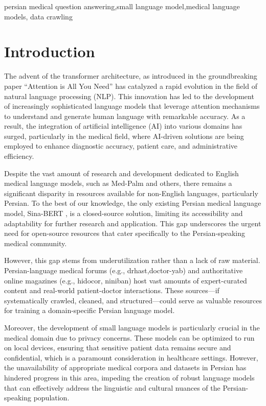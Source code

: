 \documentclass[conference]{IEEEtran}
\begin{document}
\begin{IEEEkeywords}
persian medical question answering,small language model,medical language models, data crawling
\end{IEEEkeywords}

\section{Introduction}
The advent of the transformer architecture, as introduced in the groundbreaking paper “Attention is All You Need”
\cite{b1}
has catalyzed a rapid evolution in the field of natural language processing (NLP). This innovation has led to the development of increasingly sophisticated language models that leverage attention mechanisms to understand and generate human language with remarkable accuracy. As a result, the integration of artificial intelligence (AI) into various domains has surged, particularly in the medical field, where AI-driven solutions are being employed to enhance diagnostic accuracy, patient care, and administrative efficiency.

Despite the vast amount of research and development dedicated to English medical language models, such as Med-Palm
\cite{b2} \cite{b3}
and others, there remains a significant disparity in resources available for non-English languages, particularly Persian. To the best of our knowledge, the only existing Persian medical language model, Sina-BERT
\cite{b4}
, is a closed-source solution, limiting its accessibility and adaptability for further research and application. This gap underscores the urgent need for open-source resources that cater specifically to the Persian-speaking medical community.

However, this gap stems from underutilization rather than a lack of raw material. Persian-language medical forums (e.g., drhast,doctor-yab) and authoritative online magazines (e.g., hidocor, niniban) host vast amounts of expert-curated content and real-world patient-doctor interactions. These sources—if systematically crawled, cleaned, and structured—could serve as valuable resources for training a domain-specific Persian language model.

Moreover, the development of small language models is particularly crucial in the medical domain due to privacy concerns. These models can be optimized to run on local devices, ensuring that sensitive patient data remains secure and confidential, which is a paramount consideration in healthcare settings. However, the unavailability of appropriate medical corpora and datasets in Persian has hindered progress in this area, impeding the creation of robust language models that can effectively address the linguistic and cultural nuances of the Persian-speaking population.
\end{document}
